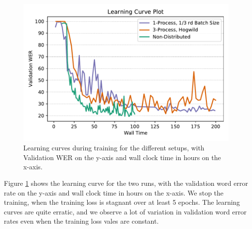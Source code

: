 \begin{figure}[ht]
  \begin{center}
    \includegraphics[width=\textwidth]{images/learning_curve_8000_hogwild.pdf} 
    \caption{Learning curves during training for the different setups, with Validation WER on the y-axis and wall clock time in hours on the x-axis.}
    \label{fig:learningcurve_async}
  \end{center}
\end{figure}

Figure \ref{fig:learningcurve_async} shows the learning curve for the two runs, with the validation word error rate on the y-axis and wall clock time in hours on the x-axis. We stop the training, when the training loss is stagnant over at least 5 epochs. The learning curves are quite erratic, and we observe a lot of variation in validation word error rates even when the training loss vales are constant. 


